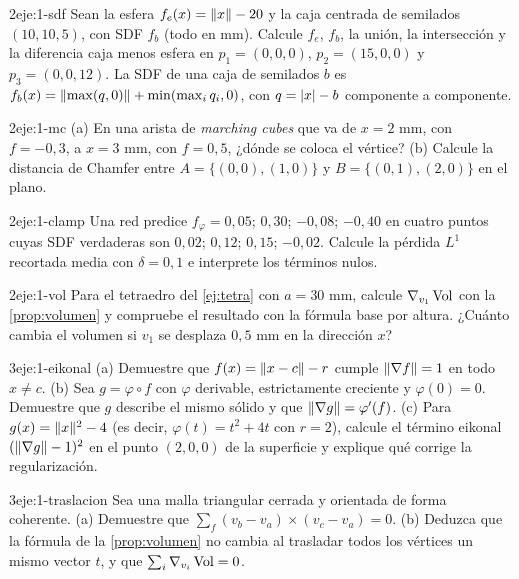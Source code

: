 \begin{ejercicio}{2}{eje:1-sdf}
Sean la esfera $f_e(x)=\lVert x\rVert-20$ y la caja centrada de semilados $(10,10,5)$, con SDF $f_b$ (todo en mm). Calcule $f_e$, $f_b$, la unión, la intersección y la diferencia caja menos esfera en $p_1=(0,0,0)$, $p_2=(15,0,0)$ y $p_3=(0,0,12)$. La SDF de una caja de semilados $b$ es $f_b(x)=\lVert\max(q,0)\rVert+\min(\max_i q_i,0)$, con $q=\lvert x\rvert-b$ componente a componente.
\end{ejercicio}

\begin{ejercicio}{2}{eje:1-mc}
(a) En una arista de \emph{marching cubes} que va de $x=2$ mm, con $f=-0{,}3$, a $x=3$ mm, con $f=0{,}5$, ¿dónde se coloca el vértice? (b) Calcule la distancia de Chamfer entre $A=\{(0,0),(1,0)\}$ y $B=\{(0,1),(2,0)\}$ en el plano.
\end{ejercicio}

\begin{ejercicio}{2}{eje:1-clamp}
Una red predice $f_\varphi=0{,}05$; $0{,}30$; $-0{,}08$; $-0{,}40$ en cuatro puntos cuyas SDF verdaderas son $0{,}02$; $0{,}12$; $0{,}15$; $-0{,}02$. Calcule la pérdida $L^1$ recortada media con $\delta=0{,}1$ e interprete los términos nulos.
\end{ejercicio}

\begin{ejercicio}{2}{eje:1-vol}
Para el tetraedro del \cref{ej:tetra} con $a=30$ mm, calcule $\nabla_{v_1}\operatorname{Vol}$ con la \cref{prop:volumen} y compruebe el resultado con la fórmula base por altura. ¿Cuánto cambia el volumen si $v_1$ se desplaza $0{,}5$ mm en la dirección $x$?
\end{ejercicio}

\begin{ejercicio}{3}{eje:1-eikonal}
(a) Demuestre que $f(x)=\lVert x-c\rVert-r$ cumple $\lVert\nabla f\rVert=1$ en todo $x\ne c$. (b) Sea $g=\varphi\circ f$ con $\varphi$ derivable, estrictamente creciente y $\varphi(0)=0$. Demuestre que $g$ describe el mismo sólido y que $\lVert\nabla g\rVert=\varphi'(f)$. (c) Para $g(x)=\lVert x\rVert^2-4$ (es decir, $\varphi(t)=t^2+4t$ con $r=2$), calcule el término eikonal $(\lVert\nabla g\rVert-1)^2$ en el punto $(2,0,0)$ de la superficie y explique qué corrige la regularización.
\end{ejercicio}

\begin{ejercicio}{3}{eje:1-traslacion}
Sea una malla triangular cerrada y orientada de forma coherente. (a) Demuestre que $\sum_{f}(v_b-v_a)\times(v_c-v_a)=0$. (b) Deduzca que la fórmula de la \cref{prop:volumen} no cambia al trasladar todos los vértices un mismo vector $t$, y que $\sum_i\nabla_{v_i}\operatorname{Vol}=0$.
\end{ejercicio}
